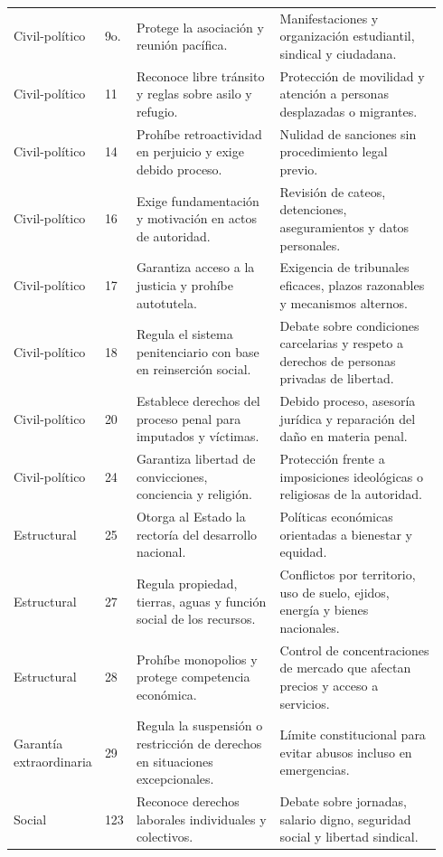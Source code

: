 \documentclass[
	spanish,
	letterpaper, oneside
]{article}
\begin{document}
\begin{landscape}
\begin{longtable}{@{}p{0.12\linewidth}p{0.07\linewidth}p{0.35\linewidth}p{0.40\linewidth}@{}}
Civil-político & 9o. & Protege la asociación y reunión pacífica. & Manifestaciones y organización estudiantil, sindical y ciudadana. \\
Civil-político & 11 & Reconoce libre tránsito y reglas sobre asilo y refugio. & Protección de movilidad y atención a personas desplazadas o migrantes. \\
Civil-político & 14 & Prohíbe retroactividad en perjuicio y exige debido proceso. & Nulidad de sanciones sin procedimiento legal previo. \\
Civil-político & 16 & Exige fundamentación y motivación en actos de autoridad. & Revisión de cateos, detenciones, aseguramientos y datos personales. \\
Civil-político & 17 & Garantiza acceso a la justicia y prohíbe autotutela. & Exigencia de tribunales eficaces, plazos razonables y mecanismos alternos. \\
Civil-político & 18 & Regula el sistema penitenciario con base en reinserción social. & Debate sobre condiciones carcelarias y respeto a derechos de personas privadas de libertad. \\
Civil-político & 20 & Establece derechos del proceso penal para imputados y víctimas. & Debido proceso, asesoría jurídica y reparación del daño en materia penal. \\
Civil-político & 24 & Garantiza libertad de convicciones, conciencia y religión. & Protección frente a imposiciones ideológicas o religiosas de la autoridad. \\
Estructural & 25 & Otorga al Estado la rectoría del desarrollo nacional. & Políticas económicas orientadas a bienestar y equidad. \\
Estructural & 27 & Regula propiedad, tierras, aguas y función social de los recursos. & Conflictos por territorio, uso de suelo, ejidos, energía y bienes nacionales. \\
Estructural & 28 & Prohíbe monopolios y protege competencia económica. & Control de concentraciones de mercado que afectan precios y acceso a servicios. \\
Garantía extraordinaria & 29 & Regula la suspensión o restricción de derechos en situaciones excepcionales. & Límite constitucional para evitar abusos incluso en emergencias. \\
Social & 123 & Reconoce derechos laborales individuales y colectivos. & Debate sobre jornadas, salario digno, seguridad social y libertad sindical. \\
\end{longtable}
\endgroup
\end{landscape}
\clearpage
\pagestyle{fancy}
\end{document}
